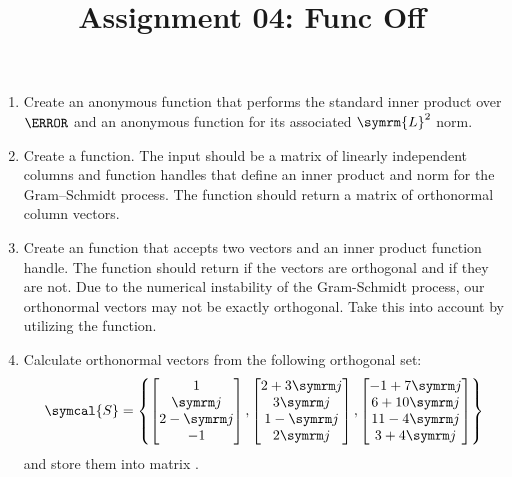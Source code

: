\documentclass{article}
\title{Assignment 04: Func Off}
\begin{document}
\renderTitle

\begin{enumerate}[leftmargin=*]
	\item
		Create an  anonymous function that performs
		the standard inner product over \(\C\) and an
		 anonymous function for its associated
		\(\symrm{L}^2\) norm.

	\item
		Create a  function.  The input
		should be a matrix of linearly independent columns and
		function handles that define an inner product and norm
		for the Gram–Schmidt process.  The function should
		return a matrix of orthonormal column vectors.

	\item
		Create an  function that accepts
		two vectors and an inner product function handle.  The
		function should return  if the vectors
		are orthogonal and  if they are not.
		Due to the numerical instability of the Gram-Schmidt
		process, our orthonormal vectors may not be exactly
		orthogonal.  Take this into account by utilizing the
		 function.

	\item
		Calculate orthonormal vectors from the following
		orthogonal set:
		\begin{equation}
			\symcal{S}
			=
			\left\{
				\begin{bmatrix}
					1       \\
					\im     \\
					2 - \im \\
					-1      \\
				\end{bmatrix},
				\begin{bmatrix}
					2 + 3\im \\
					3\im     \\
					1 - \im  \\
					2\im     \\
				\end{bmatrix},
				\begin{bmatrix}
					-1 + 7\im \\
					6 + 10\im \\
					11 - 4\im \\
					3 + 4\im  \\
				\end{bmatrix}
			\right\}
		\end{equation}
		and store them into matrix .
\end{enumerate}
\end{document}
